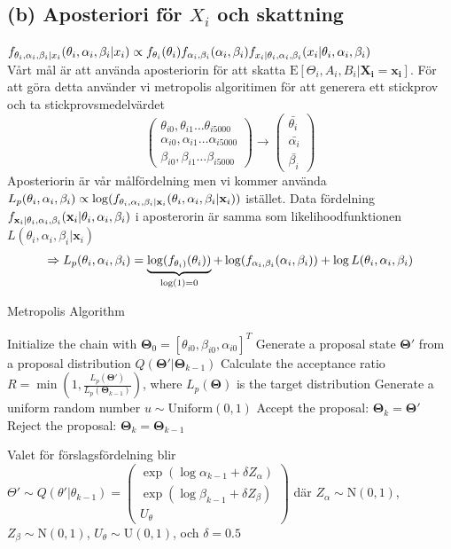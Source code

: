 \documentclass{assignment}
\begin{document}
\subsection*{(b) Aposteriori för $X_i$ och skattning} 
$f_{\theta_i, \alpha_i,\beta_i|x_i}(\theta_i, \alpha_i,\beta_i|x_i) \propto f_{\theta_i}(\theta_i)f_{\alpha_i,\beta_i}(\alpha_i,\beta_i) f_{x_i|\theta_i,\alpha_i,\beta_i}(x_i|\theta_i,\alpha_i,\beta_i)$
\\ Vårt mål är att använda aposteriorin för att skatta $\text{E}[\Theta_i,A_i,B_i|\mathbf{X_i}=\mathbf{x_i}]$.
För att göra detta använder vi metropolis algoritimen för att generera ett stickprov och ta stickprovsmedelvärdet
$$\begin{pmatrix} \theta_{i0},\theta_{i1} \dots \theta_{i5000}\\ \alpha_{i0},\alpha_{i1}\dots \alpha_{i5000}  \\ \beta_{i0},\beta_{i1}\dots \beta_{i5000}\end{pmatrix} \longrightarrow
\begin{pmatrix}
    \bar{\theta_i} \\
    \bar{\alpha_i} \\
    \bar{\beta_i}
\end{pmatrix}$$  
Aposteriorin är vår målfördelning men vi kommer använda $L_{p}(\theta_i, \alpha_i,\beta_i) \propto \log(f_{\theta_i, \alpha_i,\beta_i|\mathbf{x}_i}(\theta_i, \alpha_i,\beta_i|\mathbf{x}_i))$ istället.
Data fördelning $f_{\mathbf{x}_i|\theta_i, \alpha_i,\beta_i}(\mathbf{x}_i|\theta_i, \alpha_i,\beta_i)$ i aposterorin är samma som likelihoodfunktionen 
$L(\theta_i, \alpha_i,\beta_i|\mathbf{x}_i)$
$$
\Rightarrow L_p(\theta_i, \alpha_i,\beta_i) = \underbrace{\log(f_{\theta_i)}(\theta_i))}_{\log(1)=0}+\log(f_{\alpha_i,\beta_i}(\alpha_i,\beta_i))+\log L(\theta_i,\alpha_i,\beta_i)
$$
 
\begin{algorithm}
    \caption{Metropolis Algorithm}
    \begin{algorithmic}[1]
    \State Initialize the chain with  $\mathbf{\Theta}_0=[\theta_{i0},\beta_{i0},\alpha_{i0}]^T$
     
    \State Generate a proposal state $\mathbf{\Theta}'$ from a proposal distribution $Q(\mathbf{\Theta}' | \mathbf{\Theta}_{k-1})$
    \State Calculate the acceptance ratio $R = \min\left(1, \frac{L_p(\mathbf{\Theta}')}{L_p(\mathbf{\Theta}_{k-1})}\right)$, where $L_p(\mathbf{\Theta})$ is the target distribution
    \State Generate a uniform random number $u \sim \text{Uniform}(0, 1)$
    \State Accept the proposal: $\mathbf{\Theta}_k = \mathbf{\Theta}' $
    \Else
    \State Reject the proposal: $\mathbf{\Theta}_{k}  = \mathbf{\Theta}_{k-1}$
    \EndIf
    \EndFor
    \end{algorithmic}
\end{algorithm}
Valet för förslagsfördelning blir $\Theta'\sim Q(\theta'|\theta_{k-1}) = 
\begin{pmatrix}
    \exp(\log \alpha_{k-1} + \delta Z_\alpha)
    \\ \exp(\log \beta_{k-1} + \delta Z_\beta)
    \\ U_\theta
\end{pmatrix}$
där $Z_\alpha \sim \text{N}(0,1)$, $Z_\beta \sim \text{N}(0,1)$, $U_\theta \sim \text{U}(0,1)$, och $\delta = 0.5$
\end{document}
